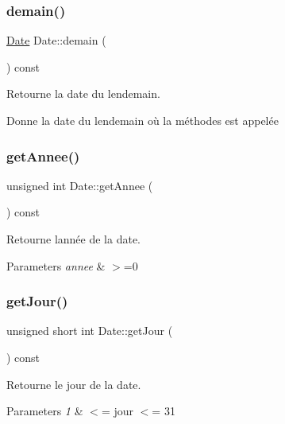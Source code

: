 \subsubsection{\texorpdfstring{demain()}{demain()}}
{\footnotesize\ttfamily \hyperlink{class_date}{Date} Date\+::demain (\begin{DoxyParamCaption}{ }\end{DoxyParamCaption}) const}



Retourne la date du lendemain. 

Donne la date du lendemain où la méthodes est appelée \mbox{\label{class_date_aa0da782e7848c098e8bff1b6ecbf6880}} 
\subsubsection{\texorpdfstring{get\+Annee()}{getAnnee()}}
{\footnotesize\ttfamily unsigned int Date\+::get\+Annee (\begin{DoxyParamCaption}{ }\end{DoxyParamCaption}) const\hspace{0.3cm}{\ttfamily [inline]}}



Retourne l\textquotesingle{}année de la date. 


\begin{DoxyParams}{Parameters}
{\em annee} & $>$=0 \\
\hline
\end{DoxyParams}
\mbox{\label{class_date_af62b5126cdc9296302151791b333c8c5}} 
\subsubsection{\texorpdfstring{get\+Jour()}{getJour()}}
{\footnotesize\ttfamily unsigned short int Date\+::get\+Jour (\begin{DoxyParamCaption}{ }\end{DoxyParamCaption}) const\hspace{0.3cm}{\ttfamily [inline]}}



Retourne le jour de la date. 


\begin{DoxyParams}{Parameters}
{\em 1} & $<$= jour $<$= 31 \\
\hline
\end{DoxyParams}
\mbox{\label{class_date_a42e4cba117fe2bf546509313cba561c8}} 
